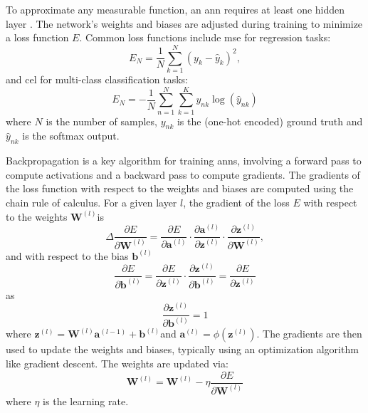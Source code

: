 \documentclass[12pt, a4paper, headinclude, twoside, plainheadsepline, open=right, numbers=noenddot, hidelinks, toc=listof, toc=bibliography]{scrreprt}
\begin{document}
To approximate any measurable function, an \ac{ann} requires at least one hidden layer \cite{hornikMultilayerFeedforwardNetworks1989}. 
The network's weights and biases are adjusted during training to minimize a loss function $E$.
Common loss functions include \ac{mse} for regression tasks:
\begin{equation}
E_N = \frac{1}{N} \sum_{k=1}^{N}(y_{k} - \hat{y}_{k})^2,
\end{equation}
and \ac{cel} for multi-class classification tasks:
\begin{equation}
E_N = -\frac{1}{N} \sum_{n=1}^{N} \sum_{k=1}^{K} y_{nk} \log (\hat{y}_{nk})
\end{equation}
where $N$ is the number of samples, $y_{nk}$ is the (one-hot encoded) ground truth and $\hat{y}_{nk}$ is the softmax output.

Backpropagation \cite{rumelhartLearningRepresentationsBackpropagating1986} is a key algorithm for training \acp{ann}, involving a forward pass to compute activations and a backward pass to compute gradients. 
The gradients of the loss function with respect to the weights and biases are computed using the chain rule of calculus. For a given layer $l$, the gradient of the loss $E$ with respect to the weights $\mathbf{W}^{(l)}$is
\begin{equation}
\Delta
\frac{\partial E}{\partial \mathbf{W}^{(l)}} = \frac{\partial E}{\partial \mathbf{a}^{(l)}} \cdot \frac{\partial \mathbf{a}^{(l)}}{\partial \mathbf{z}^{(l)}} \cdot \frac{\partial \mathbf{z}^{(l)}}{\partial \mathbf{W}^{(l)}},
\end{equation}
and with respect to the bias $\mathbf{b}^{(l)}$
\begin{equation}
\frac{\partial E}{\partial \mathbf{b}^{(l)}} = \frac{\partial E}{\partial \mathbf{z}^{(l)}} \cdot \frac{\partial \mathbf{z}^{(l)}}{\partial \mathbf{b}^{(l)}} = \frac{\partial E}{\partial \mathbf{z}^{(l)}}
\end{equation}
as 
\begin{equation}
\frac{\partial \mathbf{z}^{(l)}}{\partial \mathbf{b}^{(l)}} = 1
\end{equation}
where $\mathbf{z}^{(l)} = \mathbf{W}^{(l)} \mathbf{a}^{(l-1)} + \mathbf{b}^{(l)}$and $\mathbf{a}^{(l)} = \phi(\mathbf{z}^{(l)})$.
The gradients are then used to update the weights and biases, typically using an optimization algorithm like gradient descent.
The weights are updated via:
\begin{equation}
\mathbf{W}^{(l)} = \mathbf{W}^{(l)} - \eta \frac{\partial E}{\partial \mathbf{W}^{(l)}}
\end{equation}
where $\eta$ is the learning rate.
\end{document}
